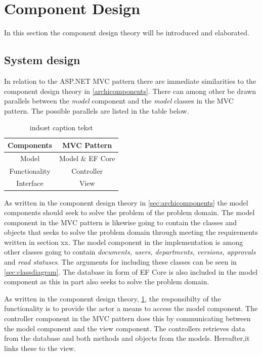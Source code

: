 \documentclass[../../master.tex]{subfiles}
\begin{document}
\section{Component Design} \label{sec:componentdesign}

In this section the component design theory will be introduced and elaborated.



\subsection{System design} \label{sec:systemdesign}

In relation to the ASP.NET MVC pattern there are immediate similarities to the component design theory in \cref{archicomponents}.
There can among other be drawn parallels between the \textit{model} component and the \textit{model} classes in the MVC pattern.
The possible parallels are listed in the table below.

\begin{table}
	\centering
	\begin{tabular}{| c | c | }
	\hline
	\textbf{Components} & \textbf{MVC Pattern} \\
	\hline
	Model & Model \& EF Core \\
	\hline
	Functionality & Controller \\
	\hline
	Interface & View \\
	\hline
\end{tabular}
\caption{{\color{red}indsæt caption tekst}}\label{tab:PatternParallels}
\end{table}

As written in the component design theory in \cref{sec:archicomponents} the model components should seek to solve the problem of the problem domain.
The model component in the MVC pattern is likewise going to contain the classes and objects that seeks to solve the problem domain through meeting the requirements written in {\color{red}section xx}.
The model component in the implementation is among other classes going to contain \textit{documents, users, departments, versions, approvals} and \textit{read statuses}.
The arguments for including these classes can be seen in \cref{sec:classdiagram}.
The database in form of EF Core is also included in the model component as this in part also seeks to solve the problem domain.

As written in the component design theory, \cref{sec:componentdesign}, the responsibilty of the functionality is to provide the actor a means to access the model component.
The controller component in the MVC pattern does this by communicating between the model component and the view component.
The controllers retrieves data from the database and both methods and objects from the models.
Hereafter,it links these to the view.
\end{document}
